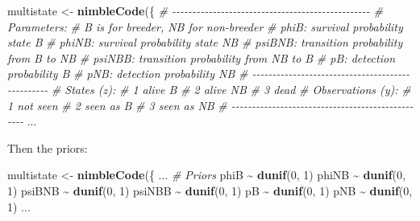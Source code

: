\documentclass[
  12pt,
]{krantz}
\newenvironment{Shaded}{\begin{snugshade}}{\end{snugshade}}
\newcommand{\CommentTok}[1]{\textcolor[rgb]{0.56,0.35,0.01}{\textit{#1}}}
\newcommand{\DecValTok}[1]{\textcolor[rgb]{0.00,0.00,0.81}{#1}}
\newcommand{\FunctionTok}[1]{\textcolor[rgb]{0.13,0.29,0.53}{\textbf{#1}}}
\newcommand{\NormalTok}[1]{#1}
\newcommand{\OtherTok}[1]{\textcolor[rgb]{0.56,0.35,0.01}{#1}}
\newcommand{\SpecialCharTok}[1]{\textcolor[rgb]{0.81,0.36,0.00}{\textbf{#1}}}
\begin{document}
\begin{Shaded}
\begin{Highlighting}[]
\NormalTok{multistate }\OtherTok{\textless{}{-}} \FunctionTok{nimbleCode}\NormalTok{(\{}
  \CommentTok{\# {-}{-}{-}{-}{-}{-}{-}{-}{-}{-}{-}{-}{-}{-}{-}{-}{-}{-}{-}{-}{-}{-}{-}{-}{-}{-}{-}{-}{-}{-}{-}{-}{-}{-}{-}{-}{-}{-}{-}{-}{-}{-}{-}{-}{-}{-}{-}{-}{-}}
  \CommentTok{\# Parameters:}
  \CommentTok{\# B is for breeder, NB for non{-}breeder}
  \CommentTok{\# phiB: survival probability state B}
  \CommentTok{\# phiNB: survival probability state NB}
  \CommentTok{\# psiBNB: transition probability from B to NB}
  \CommentTok{\# psiNBB: transition probability from NB to B}
  \CommentTok{\# pB: detection probability B}
  \CommentTok{\# pNB: detection probability NB}
  \CommentTok{\# {-}{-}{-}{-}{-}{-}{-}{-}{-}{-}{-}{-}{-}{-}{-}{-}{-}{-}{-}{-}{-}{-}{-}{-}{-}{-}{-}{-}{-}{-}{-}{-}{-}{-}{-}{-}{-}{-}{-}{-}{-}{-}{-}{-}{-}{-}{-}{-}{-}}
  \CommentTok{\# States (z):}
  \CommentTok{\# 1 alive B}
  \CommentTok{\# 2 alive NB}
  \CommentTok{\# 3 dead}
  \CommentTok{\# Observations (y):}
  \CommentTok{\# 1 not seen}
  \CommentTok{\# 2 seen as B}
  \CommentTok{\# 3 seen as NB}
  \CommentTok{\# {-}{-}{-}{-}{-}{-}{-}{-}{-}{-}{-}{-}{-}{-}{-}{-}{-}{-}{-}{-}{-}{-}{-}{-}{-}{-}{-}{-}{-}{-}{-}{-}{-}{-}{-}{-}{-}{-}{-}{-}{-}{-}{-}{-}{-}{-}{-}{-}{-}}
\NormalTok{...}
\end{Highlighting}
\end{Shaded}

Then the priors:

\begin{Shaded}
\begin{Highlighting}[]
\NormalTok{multistate }\OtherTok{\textless{}{-}} \FunctionTok{nimbleCode}\NormalTok{(\{}
\NormalTok{...}
  \CommentTok{\# Priors}
\NormalTok{  phiB }\SpecialCharTok{\textasciitilde{}} \FunctionTok{dunif}\NormalTok{(}\DecValTok{0}\NormalTok{, }\DecValTok{1}\NormalTok{)}
\NormalTok{  phiNB }\SpecialCharTok{\textasciitilde{}} \FunctionTok{dunif}\NormalTok{(}\DecValTok{0}\NormalTok{, }\DecValTok{1}\NormalTok{)}
\NormalTok{  psiBNB }\SpecialCharTok{\textasciitilde{}} \FunctionTok{dunif}\NormalTok{(}\DecValTok{0}\NormalTok{, }\DecValTok{1}\NormalTok{)}
\NormalTok{  psiNBB }\SpecialCharTok{\textasciitilde{}} \FunctionTok{dunif}\NormalTok{(}\DecValTok{0}\NormalTok{, }\DecValTok{1}\NormalTok{)}
\NormalTok{  pB }\SpecialCharTok{\textasciitilde{}} \FunctionTok{dunif}\NormalTok{(}\DecValTok{0}\NormalTok{, }\DecValTok{1}\NormalTok{)}
\NormalTok{  pNB }\SpecialCharTok{\textasciitilde{}} \FunctionTok{dunif}\NormalTok{(}\DecValTok{0}\NormalTok{, }\DecValTok{1}\NormalTok{)}
\NormalTok{...}
\end{Highlighting}
\end{Shaded}
\end{document}
